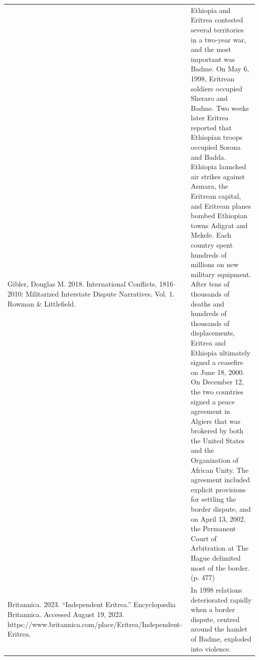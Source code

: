 {\begin{longtable}{p{}p{}}
Gibler, Douglas M. 2018. International Conflicts, 1816–2010: Militarized Interstate Dispute Narratives. Vol. 1. Rowman \& Littlefield. & Ethiopia and Eritrea contested several territories in a two-year war, and the most important was Badme. On May 6, 1998, Eritrean soldiers occupied Sheraro and Badme. Two weeks later Eritrea reported that Ethiopian troops occupied Sorona and Badda. Ethiopia launched air strikes against Asmara, the Eritrean capital, and Eritrean planes bombed Ethiopian towns Adigrat and Mekele. Each country spent hundreds of millions on new military equipment. After tens of thousands of deaths and hundreds of thousands of displacements, Eritrea and Ethiopia ultimately signed a ceasefire on June 18, 2000. On December 12, the two countries signed a peace agreement in Algiers that was brokered by both the United States and the Organization of African Unity. The agreement included explicit provisions for settling the border dispute, and on April 13, 2002, the Permanent Court of Arbitration at The Hague delimited most of the border. (p. 477)
\\
Britannica. 2023. “Independent Eritrea.” Encyclopædia Britannica. Accessed August 19, 2023. https://www.britannica.com/place/Eritrea/Independent-Eritrea. & In 1998 relations deteriorated rapidly when a border dispute, centred around the hamlet of Badme, exploded into violence.
\\

\end{longtable}}
